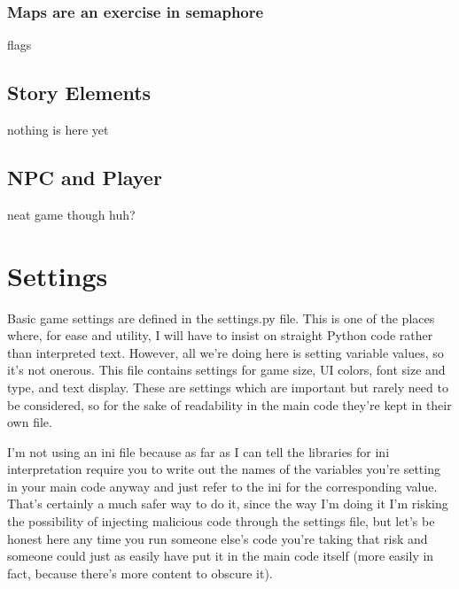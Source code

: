 \documentclass[11pt]{article}
\begin{document}
\subsubsection{Maps are an exercise in semaphore}
flags
\subsection{Story Elements}
nothing is here yet
\subsection{NPC and Player}
neat game though huh?
\section{Settings}
Basic game settings are defined in the settings.py file.
This is one of the places where, for ease and utility, I will have to insist on straight Python code rather than interpreted text.
However, all we're doing here is setting variable values, so it's not onerous.
This file contains settings for game size, UI colors, font size and type, and text display.
These are settings which are important but rarely need to be considered, so for the sake of readability in the main code they're kept in their own file.

I'm not using an ini file because as far as I can tell the libraries for ini interpretation require you to write out the names of the variables you're setting in your main code anyway and just refer to the ini for the corresponding value.
That's certainly a much safer way to do it, since the way I'm doing it I'm risking the possibility of injecting malicious code through the settings file, but let's be honest here any time you run someone else's code you're taking that risk and someone could just as easily have put it in the main code itself (more easily in fact, because there's more content to obscure it).
\end{document}
